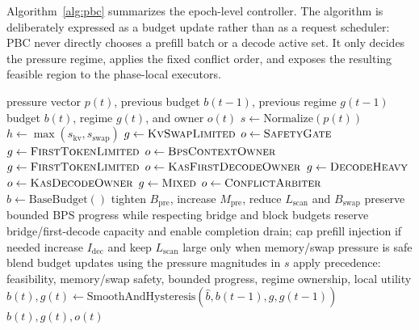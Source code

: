 \documentclass[lettersize,journal]{IEEEtran}
\begin{document}
Algorithm~\ref{alg:pbc} summarizes the epoch-level controller. The algorithm is deliberately expressed as a budget update rather than as a request scheduler: PBC never directly chooses a prefill batch or a decode active set. It only decides the pressure regime, applies the fixed conflict order, and exposes the resulting feasible region to the phase-local executors.

\begin{algorithm}[t]
\caption{Pressure-Budget Controller (PBC)}
\label{alg:pbc}
\begin{algorithmic}[1]
\REQUIRE pressure vector $p(t)$, previous budget $b(t-1)$, previous regime $g(t-1)$
\ENSURE budget $b(t)$, regime $g(t)$, and owner $o(t)$
\STATE $s \leftarrow \mathrm{Normalize}(p(t))$
\STATE $h \leftarrow \max(s_{\mathrm{kv}}, s_{\mathrm{swap}})$ 
    \STATE $g \leftarrow \textsc{KvSwapLimited}$
    \STATE $o \leftarrow \textsc{SafetyGate}$
    \STATE $g \leftarrow \textsc{FirstTokenLimited}$
    \STATE $o \leftarrow \textsc{BpsContextOwner}$
    \STATE $g \leftarrow \textsc{FirstTokenLimited}$
    \STATE $o \leftarrow \textsc{KasFirstDecodeOwner}$
    \STATE $g \leftarrow \textsc{DecodeHeavy}$
    \STATE $o \leftarrow \textsc{KasDecodeOwner}$
\ELSE
    \STATE $g \leftarrow \textsc{Mixed}$
    \STATE $o \leftarrow \textsc{ConflictArbiter}$
\ENDIF
\STATE $\hat{b} \leftarrow \mathrm{BaseBudget}()$
    \STATE tighten $B_{\mathrm{pre}}$, increase $M_{\mathrm{pre}}$, reduce $L_{\mathrm{scan}}$ and $B_{\mathrm{swap}}$
    \STATE preserve bounded BPS progress while respecting bridge and block budgets
    \STATE reserve bridge/first-decode capacity and enable completion drain; cap prefill injection if needed
    \STATE increase $I_{\mathrm{dec}}$ and keep $L_{\mathrm{scan}}$ large only when memory/swap pressure is safe
\ELSE
    \STATE blend budget updates using the pressure magnitudes in $s$
\ENDIF
\STATE apply precedence: feasibility, memory/swap safety, bounded progress, regime ownership, local utility
\STATE $b(t),g(t) \leftarrow \mathrm{SmoothAndHysteresis}(\hat{b}, b(t-1), g, g(t-1))$
\RETURN $b(t), g(t), o(t)$
\end{algorithmic}
\end{algorithm}
\end{document}
